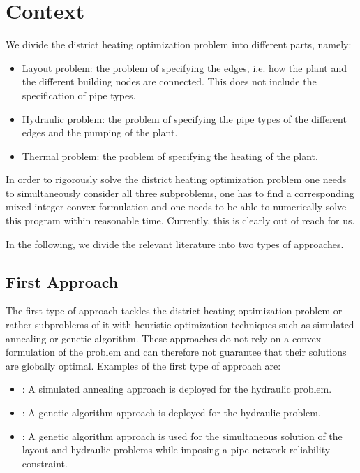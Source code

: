 \documentclass[a4paper,10pt]{article}
\begin{document}
\section{Context}

We divide the district heating optimization problem into different parts, namely:
\begin{itemize}
  \item Layout problem: the problem of specifying the edges, i.e. how the plant and the different building nodes are connected.
  This does not include the specification of pipe types.
  \item Hydraulic problem: the problem of specifying the pipe types of the different edges and the pumping of the plant.
  \item Thermal problem: the problem of specifying the heating of the plant.
\end{itemize}
In order to rigorously solve the district heating optimization problem one needs to simultaneously consider all three subproblems, one has to find a corresponding mixed integer convex formulation and one needs to be able to numerically solve this program within reasonable time. 
Currently, this is clearly out of reach for us.

In the following, we divide the relevant literature into two types of approaches. 

\subsection{First Approach}
The first type of approach tackles the district heating optimization problem or rather subproblems of it with heuristic optimization techniques such as simulated annealing or genetic algorithm. 
These approaches do not rely on a convex formulation of the problem and can therefore not guarantee that their solutions are globally optimal.
Examples of the first type of approach are:
\begin{itemize}
  \item \cite{Cunha}: A simulated annealing approach is deployed for the hydraulic problem.
  \item \cite{Djebedjian}: A genetic algorithm approach is deployed for the hydraulic problem.
  \item \cite{Afshar}: A genetic algorithm approach is used for the simultaneous solution of the layout and hydraulic problems while imposing a pipe network reliability constraint.
\end{itemize}
\end{document}
